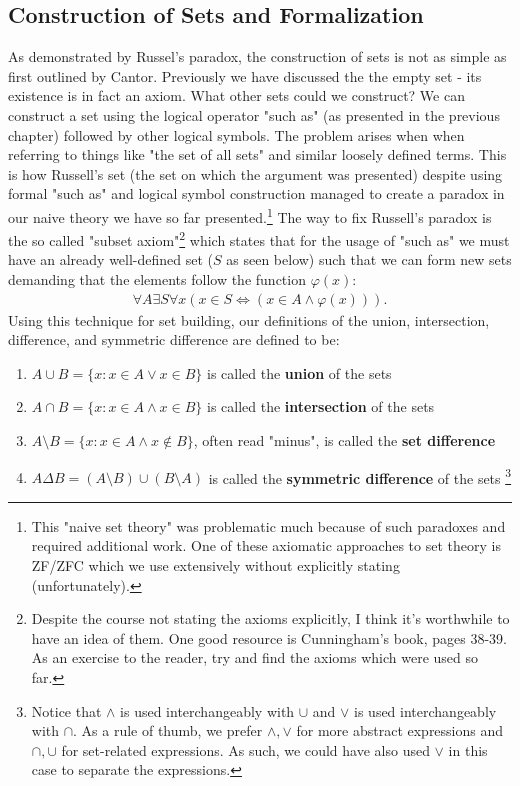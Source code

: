 \documentclass{tufte-handout} %
\theoremstyle{definition}
\theoremstyle{remark}
\begin{document}

\subsection{Construction of Sets and Formalization}
As demonstrated by Russel's paradox, the construction of sets is not as simple as first outlined by Cantor. Previously we have discussed the the empty set - its existence is in fact an axiom. What other sets could we construct? We can construct a set using the logical operator "such as" (as presented in the previous chapter) followed by other logical symbols. The problem arises when when referring to things like "the set of all sets" and similar loosely defined terms. This is how Russell's set (the set on which the argument was presented) despite using formal "such as" and logical symbol construction managed to create a paradox in our naive theory we have so far presented.\footnote{This "naive set theory" was problematic much because of such paradoxes and required additional work. One of these axiomatic approaches to set theory is ZF/ZFC which we use extensively without explicitly stating (unfortunately).} The way to fix Russell's paradox is the so called "subset axiom"\footnote{Despite the course not stating the axioms explicitly, I think it's worthwhile to have an idea of them. One good resource is Cunningham's book, pages 38-39. As an exercise to the reader, try and find the axioms which were used so far.} which states that for the usage of "such as" we must have an already well-defined set ($S$ as seen below) such that we can form new sets demanding that the elements follow the function $\varphi(x)$:
\begin{align*}
    \forall A \exists S \forall x (x \in S \Longleftrightarrow (x\in A \land \varphi(x))).
\end{align*}
Using this technique for set building, our definitions of the union, intersection, difference, and symmetric difference are defined to be:
\begin{enumerate}
    \item $A\cup B = \{x: x\in A \vee x\in B\}$ is called the \textbf{union} of the sets
    \item $A\cap B = \{x: x\in A \wedge x\in B\}$ is called the \textbf{intersection} of the sets
    \item $A\setminus B = \{x: x\in A \wedge x\not\in B\}$, often read "minus", is called the \textbf{set difference} 
    \item $A\Delta B = (A\setminus B) \cup (B\setminus A)$ is called the \textbf{symmetric difference} of the sets \footnote{Notice that $\wedge$ is used interchangeably with $\cup$ and $\vee$ is used interchangeably with $\cap$. As a rule of thumb, we prefer $\wedge, \vee$ for more abstract expressions and $\cap, \cup$ for set-related expressions. As such, we could have also used $\vee$ in this case to separate the expressions.}
\end{enumerate}
\end{document}
